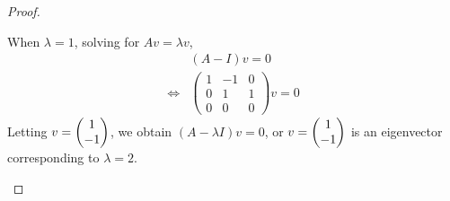 \begin{proof}
\begin{enumerate}[(i)]
              When $\lambda=1$, solving for $Av=\lambda v$,
              \[
                  \begin{aligned}
                       & (A-I)v=0                   \\
                      \iff
                       & \begin{pmatrix}
                            1 & -1 & 0\\
                            0 & 1 & 1\\
                            0 & 0 & 0
                       \end{pmatrix}v=0
                  \end{aligned}
              \]
              Letting $v=\begin{pmatrix} 1\\ -1\end{pmatrix}$, we obtain $(A-\lambda I)v=0$, or $v=\begin{pmatrix} 1\\ -1\end{pmatrix}$ is an eigenvector corresponding to $\lambda=2$.

    \end{enumerate}

\end{proof}